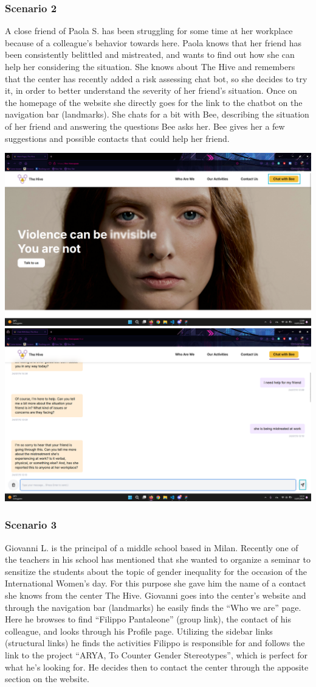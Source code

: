 \subsubsection{Scenario 2}
A close friend of Paola S. has been struggling for some time at her workplace because of a colleague’s behavior towards here. 
Paola knows that her friend has been consistently belittled and mistreated, and wants to find out how she can help her considering 
the situation. She knows about The Hive and remembers that the center has recently added a risk assessing chat bot, so she decides 
to try it, in order to better understand the severity of her friend's situation. Once on the homepage of the website she directly 
goes for the link to the chatbot on the navigation bar (landmarks). 
She chats for a bit with Bee, describing the situation of her friend and answering the questions Bee asks her. 
Bee gives her a few suggestions and possible contacts that could help her friend.

\includegraphics[width=0.5\linewidth]{img/design-document/interaction-scenarios/scenario2/step-1.png}
\includegraphics[width=0.5\linewidth]{img/design-document/interaction-scenarios/scenario2/step-2.png}

\subsubsection{Scenario 3}
Giovanni L. is the principal of a middle school based in Milan. Recently one of the teachers in his school has mentioned that she 
wanted to organize a seminar to sensitize the students about the topic of gender inequality for the occasion of the International 
Women’s day. For this purpose she gave him the name of a contact she knows from the center The Hive.  Giovanni goes into the center’s 
website and through the navigation bar (landmarks) he easily finds the “Who we are” page. Here he browses to find “Filippo Pantaleone” 
(group link), the contact of his colleague, and looks through his Profile page. Utilizing the sidebar links (structural links) he finds 
the activities Filippo is responsible for and follows the link to the project “ARYA, To Counter Gender Stereotypes”, which is perfect for 
what he’s looking for. He decides then to contact the center through the apposite section on the website.

